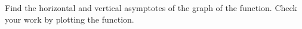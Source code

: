 Find the horizontal and vertical asymptotes of the graph of the function. Check your work by plotting the function.
